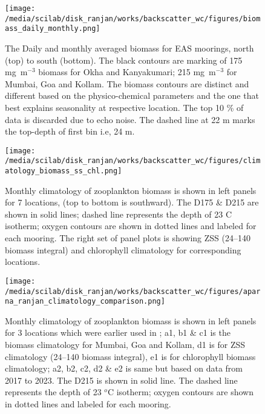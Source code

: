 \documentclass{article}
\begin{document}
\newpage

\begin{figure}[htbp]
	\centering
	\texttt{[image: /media/scilab/disk\_ranjan/works/backscatter\_wc/figures/biomass\_daily\_monthly.png]} 
	\captionsetup{justification=justified,font=footnotesize,skip=0.05\baselineskip,width=\textwidth}
	\caption{The Daily and monthly averaged biomass for EAS moorings, north (top) to south (bottom). The black contours are marking of 175 mg~m$^{-3}$ biomass for Okha and Kanyakumari; 215 mg~m$^{-3}$  for Mumbai, Goa and Kollam. The biomass contours are distinct and different based on the physico-chemical parameters and the one that best explains seasonality at respective location.  The top 10 \% of data is discarded due to echo noise. The dashed line at 22 m marks the top-depth of first bin i.e, 24 m.}
	\label{fig:dailynmonthly}
\end{figure}

\begin{figure}[htbp]
	\centering
	\texttt{[image: /media/scilab/disk\_ranjan/works/backscatter\_wc/figures/climatology\_biomass\_ss\_chl.png]} 
	\captionsetup{justification=justified,font=footnotesize,skip=0.05\baselineskip,width=\textwidth}
	\caption{Monthly climatology of zooplankton biomass is shown in left panels for 7 locations, (top to bottom is southward). The D175 \& D215 are shown in solid lines; dashed line represents the depth of 23 C isotherm; oxygen contours are shown in dotted lines and labeled for each mooring. The right set of panel plots is showing ZSS (24--140 biomass integral) and chlorophyll climatology for corresponding locations.}
	\label{fig:zsschlclim}
\end{figure}

\begin{figure}[htbp]
	\centering
	\texttt{[image: /media/scilab/disk\_ranjan/works/backscatter\_wc/figures/aparna\_ranjan\_climatology\_comparison.png]} 
	\captionsetup{justification=justified,font=footnotesize,skip=0.05\baselineskip,width=\textwidth}
	\caption{Monthly climatology of zooplankton biomass is shown in left panels for 3 locations which were earlier used in \citep{aparna2022seasonal}; a1, b1 \& c1 is the biomass climatology for Mumbai, Goa and Kollam, d1 is for ZSS climatology (24--140 biomass integral), e1 is for chlorophyll biomass climatology; a2, b2, c2, d2 \& e2 is same but based on data from 2017 to 2023. The D215 is shown in solid line. The dashed line represents the depth of 23 $^o$C isotherm; oxygen contours are shown in dotted lines and labeled for each mooring.}
	\label{fig:zsschlclimcomp}
\end{figure}
\end{document}
